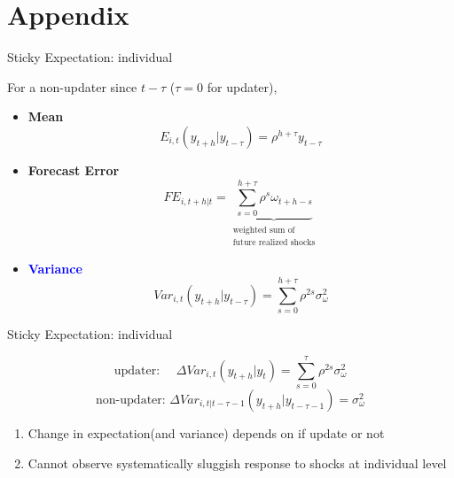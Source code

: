 \documentclass{beamer}
\begin{document}



\section{Appendix}




\begin{frame}{Sticky Expectation: individual}

For a non-updater since $t-\tau$ ($\tau=0$ for updater),
\begin{itemize}
\item \textbf{Mean} $$E_{i,t}(y_{t+h}|y_{t-\tau}) = \rho^{h+\tau} y_{t-\tau}$$  
\item \textbf{Forecast Error} $$FE_{i,t+h|t} = \underbrace{\sum^{h+\tau}_{s=0} \rho^s \omega_{t+h-s}}_{\substack{\text{weighted sum of} \\ \text{future realized shocks}} }$$
\item \textcolor{blue}{\textbf{Variance}} $$Var_{i,t}(y_{t+h}|y_{t-\tau}) = \sum^{h+\tau}_{s=0}\rho^{2s} \sigma^2_{\omega}$$	
\end{itemize}

\end{frame}


\begin{frame}{Sticky Expectation: individual}

$$\text{updater: } \quad \Delta Var_{i,t}(y_{t+h}|y_t)= \sum^{\tau}_{s=0} \rho^{2s}\sigma^2_{\omega}$$
$$\text{non-updater: }  \Delta Var_{i,t|t-\tau-1}(y_{t+h}|y_{t-\tau-1})  = \sigma^2_{\omega}$$


\begin{enumerate}
\item Change in expectation(and variance) depends on if update or not 
\item Cannot observe systematically sluggish response to shocks at individual level 
\end{enumerate}

\end{frame}
\end{document}
